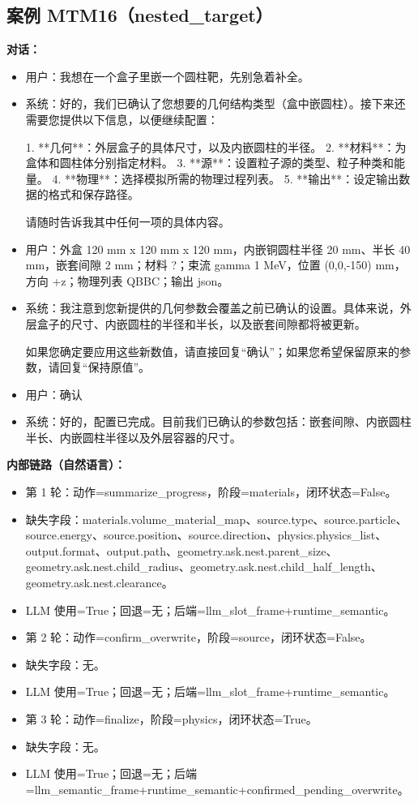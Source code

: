 \documentclass[11pt]{ctexart}
\begin{document}
\subsection{案例 MTM16（nested\_target）}
\textbf{对话：}
\begin{itemize}
\item 用户：我想在一个盒子里嵌一个圆柱靶，先别急着补全。
\item 系统：好的，我们已确认了您想要的几何结构类型（盒中嵌圆柱）。接下来还需要您提供以下信息，以便继续配置：

1.  **几何**：外层盒子的具体尺寸，以及内嵌圆柱的半径。
2.  **材料**：为盒体和圆柱体分别指定材料。
3.  **源**：设置粒子源的类型、粒子种类和能量。
4.  **物理**：选择模拟所需的物理过程列表。
5.  **输出**：设定输出数据的格式和保存路径。

请随时告诉我其中任何一项的具体内容。
\item 用户：外盒 120 mm x 120 mm x 120 mm，内嵌铜圆柱半径 20 mm、半长 40 mm，嵌套间隙 2 mm；材料 ?；束流 gamma 1 MeV，位置 (0,0,-150) mm，方向 +z；物理列表 QBBC；输出 json。
\item 系统：我注意到您新提供的几何参数会覆盖之前已确认的设置。具体来说，外层盒子的尺寸、内嵌圆柱的半径和半长，以及嵌套间隙都将被更新。

如果您确定要应用这些新数值，请直接回复“确认”；如果您希望保留原来的参数，请回复“保持原值”。
\item 用户：确认
\item 系统：好的，配置已完成。目前我们已确认的参数包括：嵌套间隙、内嵌圆柱半长、内嵌圆柱半径以及外层容器的尺寸。
\end{itemize}
\textbf{内部链路（自然语言）：}
\begin{itemize}
\item 第 1 轮：动作=summarize\_progress，阶段=materials，闭环状态=False。
\item 缺失字段：materials.volume\_material\_map、source.type、source.particle、source.energy、source.position、source.direction、physics.physics\_list、output.format、output.path、geometry.ask.nest.parent\_size、geometry.ask.nest.child\_radius、geometry.ask.nest.child\_half\_length、geometry.ask.nest.clearance。
\item LLM 使用=True；回退=无；后端=llm\_slot\_frame+runtime\_semantic。
\item 第 2 轮：动作=confirm\_overwrite，阶段=source，闭环状态=False。
\item 缺失字段：无。
\item LLM 使用=True；回退=无；后端=llm\_slot\_frame+runtime\_semantic。
\item 第 3 轮：动作=finalize，阶段=physics，闭环状态=True。
\item 缺失字段：无。
\item LLM 使用=True；回退=无；后端=llm\_semantic\_frame+runtime\_semantic+confirmed\_pending\_overwrite。
\end{itemize}
\end{document}
